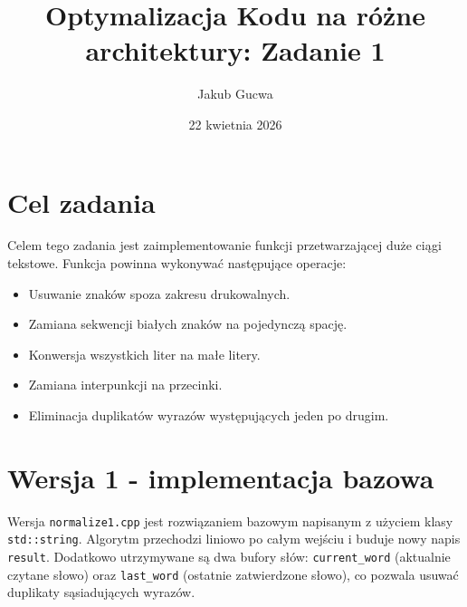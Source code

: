 \documentclass{article}
\author{Jakub Gucwa}
\date{22 kwietnia 2026}
\title{Optymalizacja Kodu na różne architektury: Zadanie 1}
\begin{document}
\maketitle

\section{Cel zadania}
Celem tego zadania jest zaimplementowanie funkcji przetwarzającej duże ciągi tekstowe. Funkcja powinna wykonywać następujące operacje:
\begin{itemize}
    \item Usuwanie znaków spoza zakresu drukowalnych.
    \item Zamiana sekwencji białych znaków na pojedynczą spację.
    \item Konwersja wszystkich liter na małe litery.
    \item Zamiana interpunkcji na przecinki.
    \item Eliminacja duplikatów wyrazów występujących jeden po drugim.
\end{itemize}

\section{Wersja 1 - implementacja bazowa}
Wersja \texttt{normalize1.cpp} jest rozwiązaniem bazowym napisanym z użyciem klasy \texttt{std::string}. Algorytm przechodzi liniowo po całym wejściu i buduje nowy napis \texttt{result}. Dodatkowo utrzymywane są dwa bufory słów: \texttt{current\_word} (aktualnie czytane słowo) oraz \texttt{last\_word} (ostatnie zatwierdzone słowo), co pozwala usuwać duplikaty sąsiadujących wyrazów.
\end{document}
